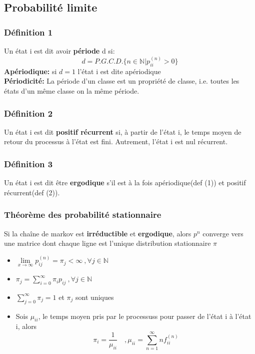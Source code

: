 \documentclass[13pt]{article}
\begin{document}
\subsection*{Probabilité limite}

\subsubsection*{Définition 1}
Un état i est dit avoir \textbf{période} d si:
\[ d = P.G.C.D.\{ n \in \mathbb{N}|p_{ii}^{(n)} > 0 \} \]
\textbf{Apériodique:} si $d=1$ l'état i est dite apériodique\\
\textbf{Périodicité:} La période d'un classe est un propriété de classe, i.e. toutes les états d'un même classe on la même période.

\subsubsection*{Définition 2}
Un état i est dit \textbf{positif récurrent} si, à partir de l'état i, le temps moyen de retour 
du processus à l'état  est fini. Autrement, l'état i est nul récurrent.

\subsubsection*{Définition 3}
Un état i est dit être \textbf{ergodique} s’il est à la fois apériodique(def (1)) et positif récurrent(def (2)).

\subsubsection*{Théorème des probabilité stationnaire}
Si la chaîne de markov est \textbf{irréductible} et \textbf{ergodique}, alors $p^n$ converge vers une matrice dont chaque ligne est l'unique distribution stationnaire $\pi$ 
\begin{itemize}
  \item $\lim\limits_{x \to \infty} p_{ij}^{(n)} = \pi_j < \infty \:,\forall j \in \mathbb{N}$ 
  \item $\pi_j = \sum\limits_{i=0}^\infty \pi_i p_{ij} \:,\forall j \in \mathbb{N}$
  \item $\sum\limits_{j=0}^\infty \pi_j = 1$ et $\pi_j$ sont uniques
  \item Sois $\mu_{ii}$, le temps moyen pris par le processuss pour passer de l'état i à l'état i, alors
  \[ \pi_i = \frac{1}{\mu_{ii}} \quad, \mu_{ii} = \sum_{n=1}^\infty n f_{ii}^{(n)} \]
\end{itemize}
\end{document}
